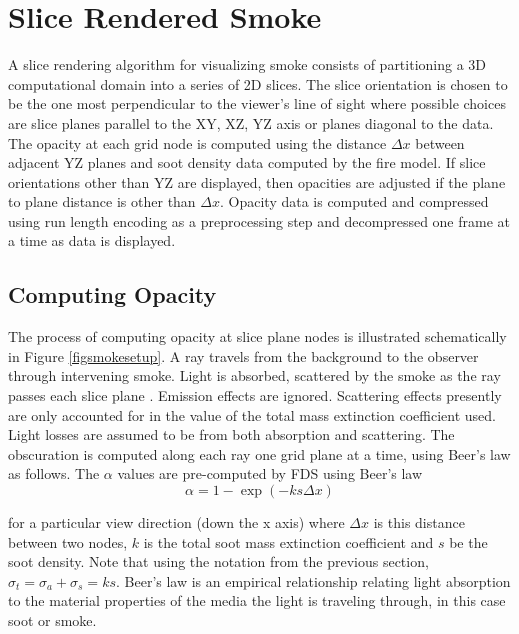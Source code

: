 %
%

\section{Slice Rendered Smoke}
A slice rendering algorithm for visualizing smoke consists of
partitioning a 3D computational domain into a series of 2D slices.
The slice orientation is chosen to be the one most perpendicular to the viewer's line
of sight where possible choices are slice planes parallel to the XY, XZ, YZ axis or planes diagonal to the data.  The opacity at each grid node is computed using the distance $\Delta x$ between adjacent YZ planes and soot density data computed by the fire model.  If slice orientations other than YZ are displayed, then opacities are adjusted if the plane to plane distance is other than $\Delta x$.  Opacity data is computed and compressed using run length encoding as a preprocessing step and decompressed one frame at a time as data is displayed.


%
%

\subsection{Computing Opacity}
The process of computing opacity at slice plane nodes is
illustrated schematically in Figure \ref{figsmokesetup}. A ray
travels from the background to the observer through intervening
smoke. Light is absorbed,
scattered by the smoke as the ray passes each slice plane .  Emission effects are ignored.
Scattering effects presently are only accounted for in the value
of the total mass extinction coefficient used.  Light losses are
assumed to be from both absorption and scattering. The obscuration
is computed along each ray one grid plane at a time, using Beer's
law as follows.  The $\alpha$ values are pre-computed by FDS using
Beer's law~\cite{Siegel:2001}
\begin{equation}
\alpha=1-\exp(-ks\Delta x) \label{eq:alpha}
\end{equation}

\noindent for a particular view direction (down the x axis) where
$\Delta x$ is this distance between two nodes, $k$ is the total
soot mass extinction coefficient and $s$ be the soot density.
Note that using the notation from the previous section, $\sigma_t=\sigma_a+\sigma_s=ks$.  Beer's law is an empirical relationship relating light absorption
to the material properties of the media the light is traveling
through, in this case soot or smoke.

